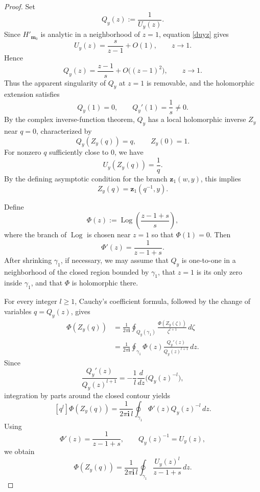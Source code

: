 \documentclass[11pt]{amsart}
\theoremstyle{plain}
\renewcommand\ell{l}
\numberwithin{equation}{section}
\numberwithin{theorem}{section}
\numberwithin{figure}{section}
\begin{document}
\begin{proof}
Set
\[
    Q_y(z):=\frac{1}{U_y(z)}.
\]
Since \(H'_{\mathbf m_0}\) is analytic in a neighborhood of \(z=1\),
equation \eqref{duyz} gives
\[
    U_y(z)
    =
    \frac{s}{z-1}+O(1),
    \qquad z\to1.
\]
Hence
\[
    Q_y(z)
    =
    \frac{z-1}{s}
    +O\bigl((z-1)^2\bigr),
    \qquad z\to1.
\]
Thus the apparent singularity of \(Q_y\) at \(z=1\) is removable, and
the holomorphic extension satisfies
\[
    Q_y(1)=0,
    \qquad
    Q_y'(1)=\frac1s\neq0.
\]
By the complex inverse-function theorem, \(Q_y\) has a local
holomorphic inverse \(Z_y\) near \(q=0\), characterized by
\[
    Q_y(Z_y(q))=q,
    \qquad
    Z_y(0)=1.
\]
For nonzero \(q\) sufficiently close to \(0\), we have
\[
    U_y(Z_y(q))=\frac1q.
\]
By the defining asymptotic condition for the branch
\(\mathbf z_1(w,y)\), this implies
\[
    Z_y(q)=\mathbf z_1(q^{-1},y).
\]

Define
\[
    \Phi(z)
    :=
    \operatorname{Log}\!
    \left(
        \frac{z-1+s}{s}
    \right),
\]
where the branch of \(\operatorname{Log}\) is chosen near \(z=1\) so
that \(\Phi(1)=0\). Then
\[
    \Phi'(z)=\frac{1}{z-1+s}.
\]
After shrinking \(\gamma_1\), if necessary, we may assume that
\(Q_y\) is one-to-one in a neighborhood of the closed region bounded
by \(\gamma_1\), that \(z=1\) is its only zero inside \(\gamma_1\),
and that \(\Phi\) is holomorphic there.

For every integer \(\ell\geq1\), Cauchy's coefficient formula,
followed by the change of variables \(q=Q_y(z)\), gives
\begin{align*}
[q^\ell]\Phi(Z_y(q))
&=
\frac{1}{2\pi\mathbf i}
\oint_{Q_y(\gamma_1)}
\frac{\Phi(Z_y(\zeta))}{\zeta^{\ell+1}}\,d\zeta\\
&=
\frac{1}{2\pi\mathbf i}
\oint_{\gamma_1}
\Phi(z)
\frac{Q_y'(z)}{Q_y(z)^{\ell+1}}\,dz.
\end{align*}
Since
\[
    \frac{Q_y'(z)}{Q_y(z)^{\ell+1}}
    =
    -\frac1\ell
    \frac{d}{dz}\bigl(Q_y(z)^{-\ell}\bigr),
\]
integration by parts around the closed contour yields
\[
[q^\ell]\Phi(Z_y(q))
=
\frac{1}{2\pi\mathbf i\,\ell}
\oint_{\gamma_1}
\Phi'(z)Q_y(z)^{-\ell}\,dz.
\]
Using
\[
    \Phi'(z)=\frac{1}{z-1+s},
    \qquad
    Q_y(z)^{-1}=U_y(z),
\]
we obtain
\begin{equation}
[q^\ell]\Phi(Z_y(q))
=
\frac{1}{2\pi\mathbf i\,\ell}
\oint_{\gamma_1}
\frac{U_y(z)^\ell}{z-1+s}\,dz.
\label{eq:LB-coefficient}
\end{equation}


\end{proof}
\end{document}
